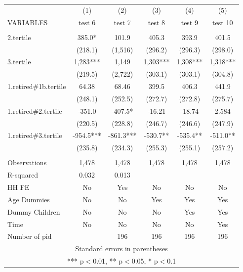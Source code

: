 \begin{tabular}{lccccc} \hline
 & (1) & (2) & (3) & (4) & (5) \\
VARIABLES & test 6 & test 7 & test 8 & test 9 & test 10 \\ \hline
 &  &  &  &  &  \\
2.tertile & 385.0* & 101.9 & 405.3 & 393.9 & 401.5 \\
 & (218.1) & (1,516) & (296.2) & (296.3) & (298.0) \\
3.tertile & 1,283*** & 1,149 & 1,303*** & 1,308*** & 1,318*** \\
 & (219.5) & (2,722) & (303.1) & (303.1) & (304.8) \\
1.retired\#1b.tertile & 64.38 & 68.46 & 399.5 & 406.3 & 441.9 \\
 & (248.1) & (252.5) & (272.7) & (272.8) & (275.7) \\
1.retired\#2.tertile & -351.0 & -407.5* & -16.21 & -18.74 & 2.584 \\
 & (220.5) & (228.8) & (246.7) & (246.6) & (247.9) \\
1.retired\#3.tertile & -954.5*** & -861.3*** & -530.7** & -535.4** & -511.0** \\
 & (235.8) & (234.3) & (255.3) & (255.1) & (257.2) \\
 &  &  &  &  &  \\
Observations & 1,478 & 1,478 & 1,478 & 1,478 & 1,478 \\
R-squared & 0.032 & 0.013 &  &  &  \\
HH FE & No & Yes & No & No & No \\
Age Dummies & No & No & Yes & Yes & Yes \\
Dummy Children & No & No & No & Yes & Yes \\
Time & No & No & No & No & Yes \\
 Number of pid &  & 196 & 196 & 196 & 196 \\ \hline
\multicolumn{6}{c}{ Standard errors in parentheses} \\
\multicolumn{6}{c}{ *** p$<$0.01, ** p$<$0.05, * p$<$0.1} \\
\end{tabular}
